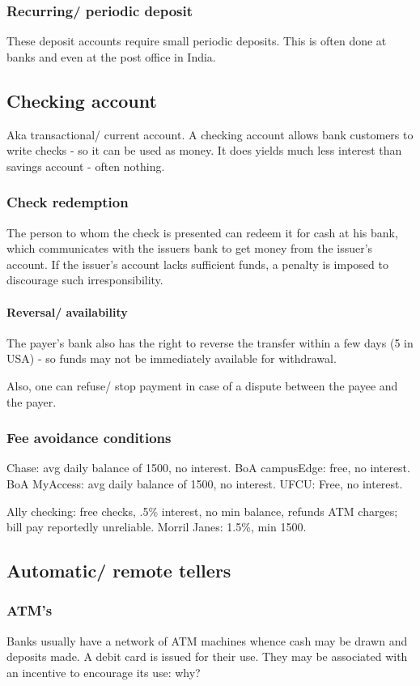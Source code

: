 \documentclass[oneside, article]{memoir}
\begin{document}
\subsubsection{Recurring/ periodic deposit}
These deposit accounts require small periodic deposits. This is often done at banks and even at the post office in India.

\subsection{Checking account}
Aka transactional/ current account. A checking account allows bank customers to write checks - so it can be used as money. It does yields much less interest than savings account - often nothing.

\subsubsection{Check redemption}
The person to whom the check is presented can redeem it for cash at his bank, which communicates with the issuers bank to get money from the issuer's account. If the issuer's account lacks sufficient funds, a penalty is imposed to discourage such irresponsibility.

\paragraph{Reversal/ availability}
The payer's bank also has the right to reverse the transfer within a few days (5 in USA) - so funds may not be immediately available for withdrawal.

Also, one can refuse/ stop payment in case of a dispute between the payee and the payer.

\subsubsection{Fee avoidance conditions}
Chase: avg daily balance of 1500, no interest. BoA campusEdge: free, no interest. BoA MyAccess: avg daily balance of 1500, no interest. UFCU: Free, no interest.

Ally checking: free checks, .5\% interest, no min balance, refunds ATM charges; bill pay reportedly unreliable. Morril Janes: 1.5\%, min 1500.

\subsection{Automatic/ remote tellers}
\subsubsection{ATM's}
Banks usually have a network of ATM machines whence cash may be drawn and deposits made. A debit card is issued for their use. They may be associated with an incentive to encourage its use: why?
\end{document}
